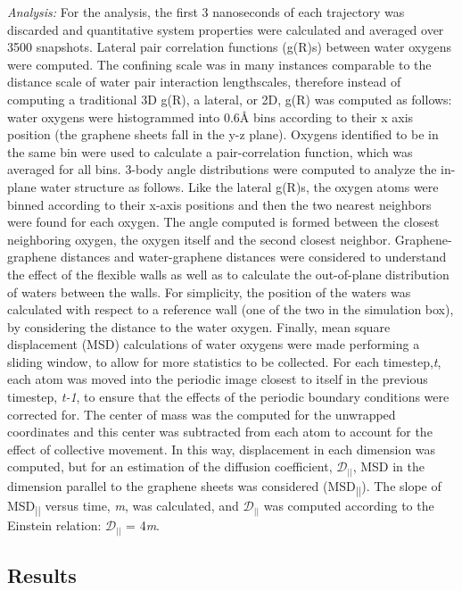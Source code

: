 \documentclass[12pt]{article}
\begin{document}
\textit{Analysis:} For the analysis, the first 3 nanoseconds of each trajectory was discarded and quantitative system properties were calculated and averaged over 3500 snapshots. Lateral pair correlation functions (g(R)s) between water oxygens were computed. The confining scale was in many instances comparable to the distance scale of water pair interaction lengthscales, therefore instead of computing a traditional 3D g(R), a lateral, or 2D, g(R) was computed as follows: water oxygens were histogrammed into 0.6\r A bins according to their x axis position (the graphene sheets fall in the y-z plane). Oxygens identified to be in the same bin were used to calculate a pair-correlation function, which was averaged for all bins. 3-body angle distributions were computed to analyze the in-plane water structure as follows. Like the lateral g(R)s, the oxygen atoms were binned according to their x-axis positions and then the two nearest neighbors were found for each oxygen. The angle computed is formed between the closest neighboring oxygen, the oxygen itself and the second closest neighbor. Graphene-graphene distances and water-graphene distances were considered to understand the effect of the flexible walls as well as to calculate the out-of-plane distribution of waters between the walls. For simplicity, the position of the waters was calculated with respect to a reference wall (one of the two in the simulation box), by considering the distance to the water oxygen. Finally, mean square displacement (MSD) calculations of water oxygens were made performing a sliding window, to allow for more statistics to be collected. For each timestep,\textit{t}, each atom was moved into the periodic image closest to itself in the previous timestep, \textit{t-1}, to ensure that the effects of the periodic boundary conditions were corrected for. The center of mass was the computed for the unwrapped coordinates and this center was subtracted from each atom to account for the effect of collective movement. In this way, displacement in each dimension was computed, but for an estimation of the diffusion coefficient, \(\mathcal{D}_{||}\), MSD in the dimension parallel to the graphene sheets was considered (MSD\textsubscript{||}). The slope of MSD\textsubscript{||} versus time, \textit{m}, was calculated, and \(\mathcal{D}_{||}\) was computed according to the Einstein relation: \(\mathcal{D}_{||}\) = 4\textit{m}.

\subsection*{Results}
\end{document}
